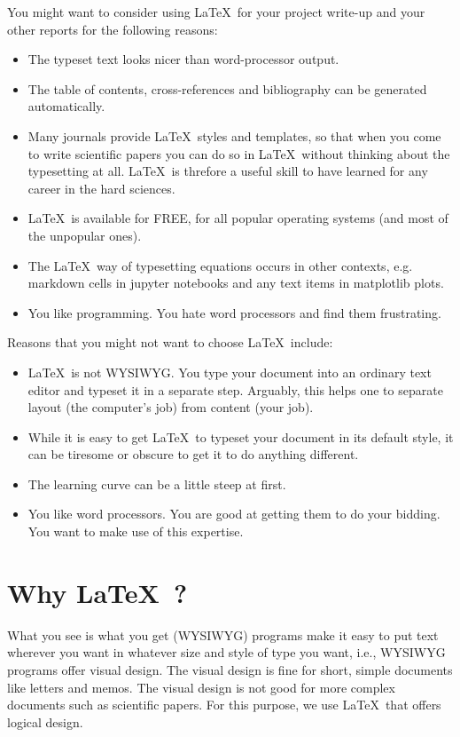 You might want to consider using \LaTeX \ for your project write-up and your other reports for the following reasons:

\begin{itemize}
    \item The typeset text looks nicer than word-processor output.
    \item The table of contents, cross-references and bibliography can be generated automatically. 
    \item Many journals provide \LaTeX \ styles and templates, so that when you come to write scientific papers you can do so in \LaTeX \ without thinking about the typesetting at all. \LaTeX \ is threfore a useful skill to have learned for any career in the hard sciences.
    \item \LaTeX \ is available for FREE, for all popular operating systems (and most of the unpopular ones).
    \item The \LaTeX \ way of typesetting equations occurs in other contexts, e.g. markdown cells in jupyter notebooks and any text items in matplotlib plots.
    \item You like programming. You hate word processors and find them frustrating.
\end{itemize}
Reasons that you might not want to choose \LaTeX \ include:
\begin{itemize}
    \item \LaTeX \ is not WYSIWYG. You type your document into an ordinary text editor and typeset it in a separate step. Arguably, this helps one to separate layout (the computer’s job) from content (your job). 
    \item While it is easy to get \LaTeX \ to typeset your document in its default style, it can be tiresome or obscure to get it to do anything different.
    \item The learning curve can be a little steep at first.
    \item You like word processors. You are good at getting them to do your bidding. You want to make use of this expertise.
\end{itemize}

\section{Why \LaTeX \ ?}

What you see is what you get (WYSIWYG) programs make it easy to put text wherever you want in whatever size and style of type you want, i.e., WYSIWYG programs offer visual design. The visual design is fine for short, simple documents like letters and memos. The visual design is not good for more complex documents such as scientific papers. For this purpose, we use \LaTeX \ that offers logical design. \\

